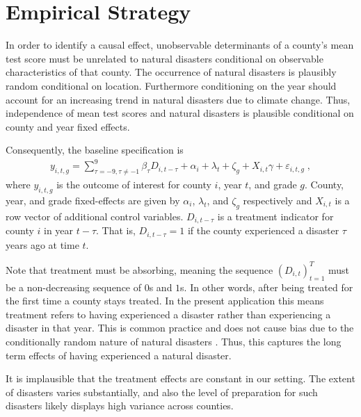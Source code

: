 
\section{Empirical Strategy}



In order to identify a causal effect, unobservable determinants of a county's mean test score must be unrelated to natural disasters conditional on observable characteristics of that county. The occurrence of natural disasters is plausibly random conditional on location. Furthermore conditioning on the year should account for an increasing trend in natural disasters due to climate change. Thus, independence of mean test scores and natural disasters is plausible conditional on county and year fixed effects.

Consequently, the baseline specification is
\begin{align} \label{baseline}
	y_{i, t, g} = \sum_{\tau = -9, \tau \neq -1}^{9} \beta_\tau D_{i, t-\tau} + \alpha_i + \lambda_t + \zeta_g + X_{i, t} \gamma + \varepsilon_{i, t, g} \;,
\end{align}
where $y_{i, t, g}$ is the outcome of interest for county $i$, year $t$, and grade $g$. County, year, and grade fixed-effects are given by $\alpha_i$, $\lambda_t$, and $\zeta_g$ respectively and $X_{i, t}$ is a row vector of additional control variables. $D_{i, t-\tau}$ is a treatment indicator for county $i$ in year $t-\tau$. That is, $D_{i, t-\tau} = 1$ if the county experienced a disaster $\tau$ years ago at time $t$.

Note that treatment must be absorbing, meaning the sequence $(D_{i, t})_{t=1}^T$ must be a non-decreasing sequence of $0$s and $1$s. In other words, after being treated for the first time a county stays treated. In the present application this means treatment refers to having experienced a disaster rather than experiencing a disaster in that year. This is common practice and does not cause bias due to the conditionally random nature of natural disasters \citep[see][]{Deryugina_2017}. Thus, this captures the long term effects of having experienced a natural disaster.

It is implausible that the treatment effects are constant in our setting. The extent of disasters varies substantially, and also the level of preparation for such disasters likely displays high variance across counties. 


